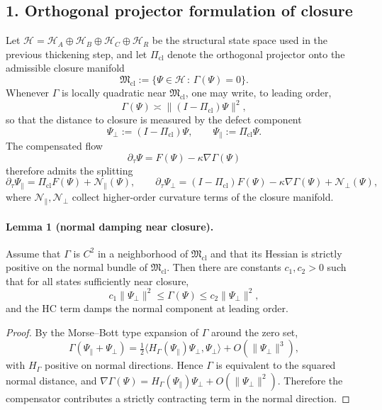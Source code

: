 \documentclass[12pt,a4paper]{article}
\begin{document}
\subsection*{1. Orthogonal projector formulation of closure}
Let $\mathcal H=\mathcal H_A\oplus\mathcal H_B\oplus\mathcal H_C\oplus\mathcal H_R$
be the structural state space used in the previous thickening step, and let
$\Pi_{\mathrm{cl}}$ denote the orthogonal projector onto the admissible closure
manifold
\[
\mathfrak M_{\mathrm{cl}}:=\{\Psi\in\mathcal H\,:\,\Gamma(\Psi)=0\}.
\]
Whenever $\Gamma$ is locally quadratic near $\mathfrak M_{\mathrm{cl}}$, one may
write, to leading order,
\[
\Gamma(\Psi)\asymp \| (I-\Pi_{\mathrm{cl}})\Psi\|^2,
\]
so that the distance to closure is measured by the defect component
\[
\Psi_{\perp}:=(I-\Pi_{\mathrm{cl}})\Psi,
\qquad
\Psi_{\parallel}:=\Pi_{\mathrm{cl}}\Psi.
\]
The compensated flow
\[
\partial_\tau \Psi = F(\Psi)-\kappa\nabla\Gamma(\Psi)
\]
therefore admits the splitting
\[
\partial_\tau \Psi_{\parallel}=\Pi_{\mathrm{cl}}F(\Psi)+\mathcal N_{\parallel}(\Psi),
\qquad
\partial_\tau \Psi_{\perp}=(I-\Pi_{\mathrm{cl}})F(\Psi)-\kappa\nabla\Gamma(\Psi)+\mathcal N_{\perp}(\Psi),
\]
where $\mathcal N_{\parallel},\mathcal N_{\perp}$ collect higher-order curvature
terms of the closure manifold.

\paragraph{Lemma 1 (normal damping near closure).}
Assume that $\Gamma$ is $C^2$ in a neighborhood of $\mathfrak M_{\mathrm{cl}}$ and that
its Hessian is strictly positive on the normal bundle of
$\mathfrak M_{\mathrm{cl}}$. Then there are constants $c_1,c_2>0$ such that for all
states sufficiently near closure,
\[
c_1\|\Psi_{\perp}\|^2\le \Gamma(\Psi)\le c_2\|\Psi_{\perp}\|^2,
\]
and the HC term damps the normal component at leading order.

\begin{proof}
By the Morse--Bott type expansion of $\Gamma$ around the zero set,
\[
\Gamma(\Psi_{\parallel}+\Psi_{\perp})=
\tfrac12\langle H_{\Gamma}(\Psi_{\parallel})\Psi_{\perp},\Psi_{\perp}\rangle
+O(\|\Psi_{\perp}\|^3),
\]
with $H_{\Gamma}$ positive on normal directions. Hence $\Gamma$ is equivalent to
the squared normal distance, and
$\nabla\Gamma(\Psi)=H_{\Gamma}(\Psi_{\parallel})\Psi_{\perp}+O(\|\Psi_{\perp}\|^2)$.
Therefore the compensator contributes a strictly contracting term in the normal
direction.
\end{proof}
\end{document}
